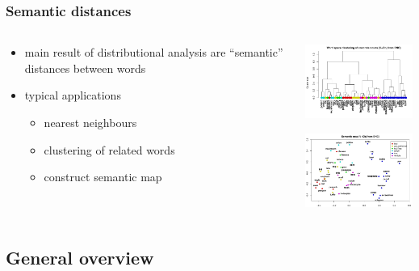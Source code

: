 \begin{frame}
  \frametitle{Semantic distances}

  \begin{columns}[T]
    \begin{column}{55mm}
      \begin{itemize}
      \item main result of distributional analysis are ``semantic'' distances between words
      \item typical applications
        \begin{itemize}
        \item nearest neighbours
        \item clustering of related words
        \item construct semantic map
        \end{itemize}
      \end{itemize}
    \end{column}
    \begin{column}{55mm}
      \ungap[1]
      \includegraphics[width=50mm]{img/hieroglyph_clustering}

      \gap[1]
      \includegraphics[width=50mm]{img/hieroglyph_semantic_map}
    \end{column}
  \end{columns}
\end{frame}

\subsection{General overview}

